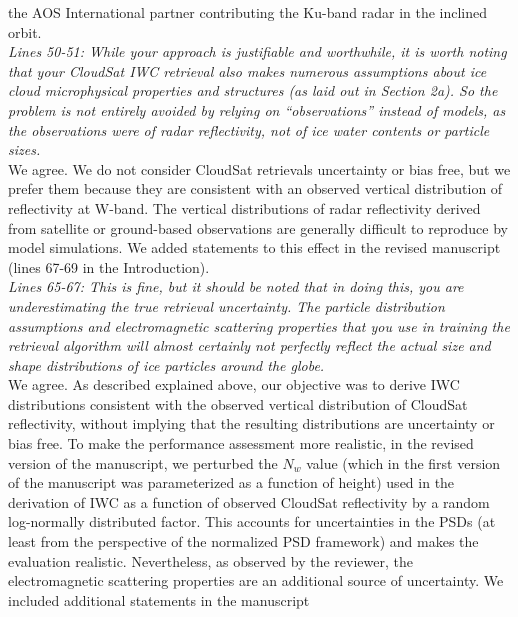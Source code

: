 \documentclass[12pt]{article}
\begin{document}
the AOS International partner contributing the Ku-band radar in the inclined orbit.\\
\newline
\textit{Lines 50-51: While your approach is justifiable and worthwhile, it is worth noting that your CloudSat IWC retrieval 
also makes numerous assumptions about ice cloud microphysical properties and structures (as laid out in Section 2a). 
So the problem is not entirely avoided by relying on “observations” instead of models, as the observations were of 
radar reflectivity, not of ice water contents or particle sizes.}\\
\newline
We agree. We do not consider CloudSat retrievals uncertainty or bias free, but we prefer them because
they are consistent with an observed vertical distribution of reflectivity at W-band. The vertical distributions of radar reflectivity
derived from satellite or ground-based observations are generally difficult to reproduce by model simulations.
We added statements
to this effect in the revised manuscript (lines 67-69 in the Introduction).\\
\newline
\textit{Lines 65-67: This is fine, but it should be noted that in doing this, you are underestimating the true retrieval 
uncertainty. The particle distribution assumptions and electromagnetic scattering properties that you use in training 
the retrieval algorithm will almost certainly not perfectly reflect the actual size and shape distributions of ice 
particles around the globe.}\\
\newline
We agree. As described explained above, our  objective was to derive IWC distributions consistent with the observed vertical distribution of
CloudSat reflectivity, without implying that the resulting distributions are uncertainty or bias free.  To make the performance
assessment more realistic, in the revised version of the manuscript, we perturbed the $N_w$ value (which in the first version 
of the manuscript was
parameterized as a function of height) used in the derivation of IWC as a function of observed CloudSat reflectivity by a random log-normally
distributed factor. This accounts for uncertainties in the PSDs (at least from the perspective of the normalized PSD framework) and 
makes the evaluation realistic. Nevertheless, as observed by the reviewer, the electromagnetic scattering properties are 
an additional source of uncertainty.  We included additional statements in the manuscript 
\end{document}
